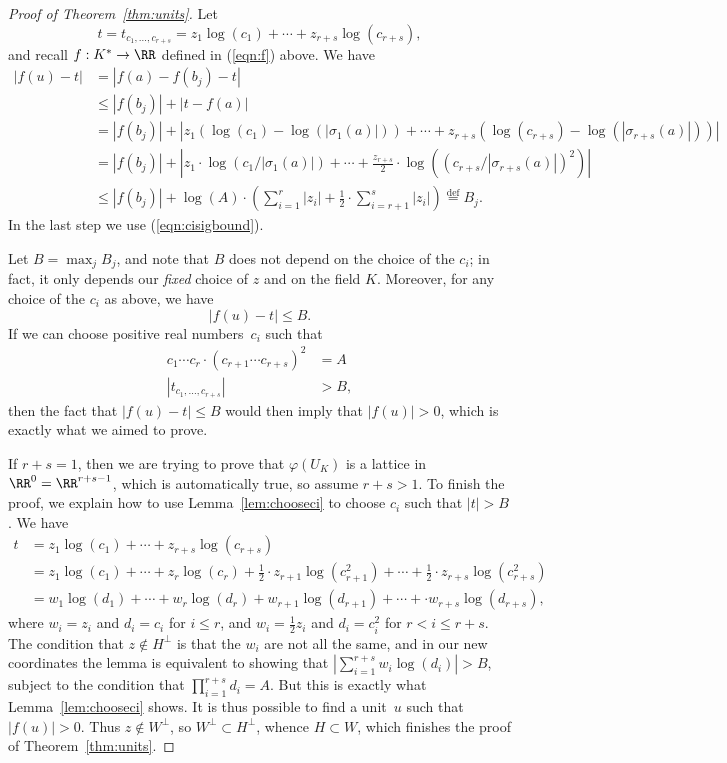 \begin{proof}[Proof of Theorem~\ref{thm:units}]
  Let
  \[
    t = t_{c_1,\dots, c_{r+s}} = z_1\log(c_1)+\cdots +z_{r+s}\log(c_{r+s}),
  \]
  and recall $f:K^* \to \RR$ defined in (\ref{eqn:f}) above. We have
  \begin{align*}
    |f(u) - t| &= |f(a) - f(b_j) - t| \\
    &\leq |f(b_j)| + |t - f(a)| \\
    &=|f(b_j)| + \left|z_1(\log(c_1) - \log(|\sigma_1(a)|)) + \cdots + z_{r+s}(\log(c_{r+s}) - \log(|\sigma_{r+s}(a)|))\right|
    \\
    &=|f(b_j)| + \left|z_1\cdot \log(c_1/|\sigma_1(a)|) + \cdots + \frac{z_{r+s}}{2}\cdot \log((c_{r+s}/|\sigma_{r+s}(a)|)^2)\right|
    \\
    &\leq |f(b_j)| + \log(A)\cdot\left(\sum_{i=1}^{r}|z_i| + \frac{1}{2}\cdot \sum_{i=r+1}^s|z_i|\right)
    \overset{\text{def}}{=} B_j.
  \end{align*}
  In the last step we use (\ref{eqn:cisigbound}).

  Let $B=\max_{j} B_j$, and note that $B$ does not depend on the choice
  of the $c_i$; in fact, it only depends our {\em fixed} choice of $z$ and
  on the field $K$. Moreover, for any choice of the $c_i$ as above, we have
  \[
    |f(u) - t| \leq B.
  \]
  If we can choose positive real numbers~$c_i$ such that
  \begin{align*}
    c_1\cdots c_r\cdot (c_{r+1}\cdots c_{r+s})^2 &= A
    \\
    |t_{c_1,\dots, c_{r+s}}| &>B,
  \end{align*}
  then the fact that $|f(u)-t|\leq B$ would then imply that $|f(u)|>0$,
  which is exactly what we aimed to prove.

  If $r+s=1$, then we are trying to prove that $\varphi(U_K)$ is a lattice
  in $\RR^0 = \RR^{r+s-1}$, which is automatically true, so assume $r+s > 1$.
  To finish the proof, we explain how to use Lemma~\ref{lem:chooseci}
  to choose $c_i$ such that $|t|>B$. We have
  \begin{align*}
    t
    &= z_1\log(c_1)+\cdots + z_{r+s}\log(c_{r+s}) \\
    &= z_1\log(c_1)+\cdots + z_r\log(c_r)
    + \frac{1}{2}\cdot z_{r+1}\log(c_{r+1}^2) + \cdots
    + \frac{1}{2}\cdot z_{r+s}\log(c_{r+s}^2) \\
    &= w_1\log(d_1)+\cdots + w_r\log(d_r)+ w_{r+1}\log(d_{r+1}) +
    \cdots +\cdot w_{r+s}\log(d_{r+s}),
  \end{align*}
  where $w_i=z_i$ and $d_i=c_i$ for $i\leq r$, and
  $w_i=\frac{1}{2}z_i$ and $d_i=c_i^2$ for $r<i\leq r+s$.
  The condition that $z\not\in H^{\perp}$ is that the $w_i$ are not all
  the same, and in our new coordinates the lemma is equivalent to
  showing that $|\sum_{i=1}^{r+s} w_i \log(d_i)|>B$, subject to the
  condition that $\prod_{i=1}^{r+s} d_i = A$.
  But this is exactly what Lemma~\ref{lem:chooseci} shows. It is thus possible
  to find a unit~$u$ such that $|f(u)|>0$. Thus $z\not\in W^{\perp}$,
  so $W^{\perp}\subset H^{\perp}$, whence $H\subset W$,
  which finishes the proof of Theorem~\ref{thm:units}.
\end{proof}

